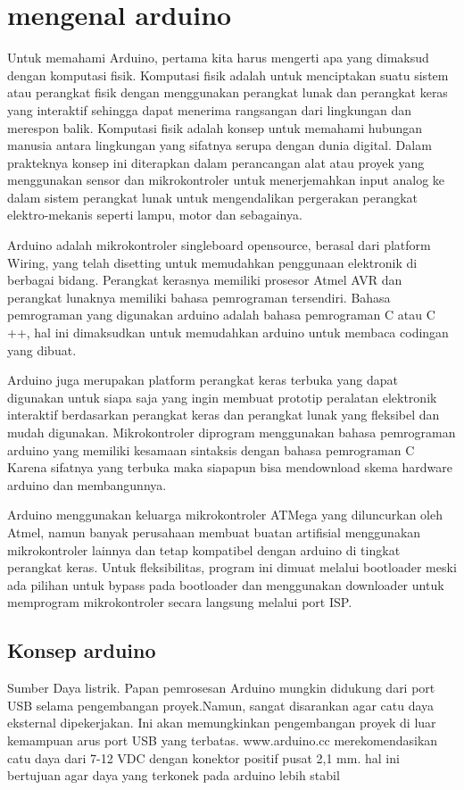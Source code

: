 \section{mengenal arduino}
	Untuk memahami Arduino, pertama kita harus mengerti apa yang dimaksud dengan komputasi fisik. Komputasi fisik adalah untuk menciptakan suatu sistem atau perangkat fisik dengan menggunakan perangkat lunak dan perangkat keras yang interaktif sehingga dapat menerima rangsangan dari lingkungan dan merespon balik. Komputasi fisik adalah konsep untuk memahami hubungan manusia antara lingkungan yang sifatnya serupa dengan dunia digital. Dalam prakteknya konsep ini diterapkan dalam perancangan alat atau proyek yang menggunakan sensor dan mikrokontroler untuk menerjemahkan input analog ke dalam sistem perangkat lunak untuk mengendalikan pergerakan perangkat elektro-mekanis seperti lampu, motor dan sebagainya.

	Arduino adalah mikrokontroler singleboard opensource, berasal dari platform Wiring, yang telah disetting untuk memudahkan penggunaan elektronik di berbagai bidang. Perangkat kerasnya memiliki prosesor Atmel AVR dan perangkat lunaknya memiliki bahasa pemrograman tersendiri. Bahasa pemrograman yang digunakan arduino adalah bahasa pemrograman C atau C ++, hal ini dimaksudkan untuk memudahkan arduino untuk membaca codingan yang dibuat.


	Arduino juga merupakan platform perangkat keras terbuka yang dapat digunakan untuk siapa saja yang ingin membuat prototip peralatan elektronik interaktif berdasarkan perangkat keras dan perangkat lunak yang fleksibel dan mudah digunakan. Mikrokontroler diprogram menggunakan bahasa pemrograman arduino yang memiliki kesamaan sintaksis dengan bahasa pemrograman C Karena sifatnya yang terbuka maka siapapun bisa mendownload skema hardware arduino dan membangunnya.

	Arduino menggunakan keluarga mikrokontroler ATMega yang diluncurkan oleh Atmel, namun banyak perusahaan membuat buatan artifisial menggunakan mikrokontroler lainnya dan tetap kompatibel dengan arduino di tingkat perangkat keras. Untuk fleksibilitas, program ini dimuat melalui bootloader meski ada pilihan untuk bypass pada bootloader dan menggunakan downloader untuk memprogram mikrokontroler secara langsung melalui port ISP.

\subsection{Konsep arduino}
	Sumber Daya listrik. Papan pemrosesan Arduino mungkin didukung dari port USB selama pengembangan proyek.Namun, sangat disarankan agar catu daya eksternal dipekerjakan. Ini akan memungkinkan pengembangan proyek di luar kemampuan arus port USB yang terbatas. www.arduino.cc merekomendasikan catu daya dari 7-12 VDC dengan konektor positif pusat 2,1 mm. hal ini bertujuan agar daya yang terkonek pada arduino lebih stabil

